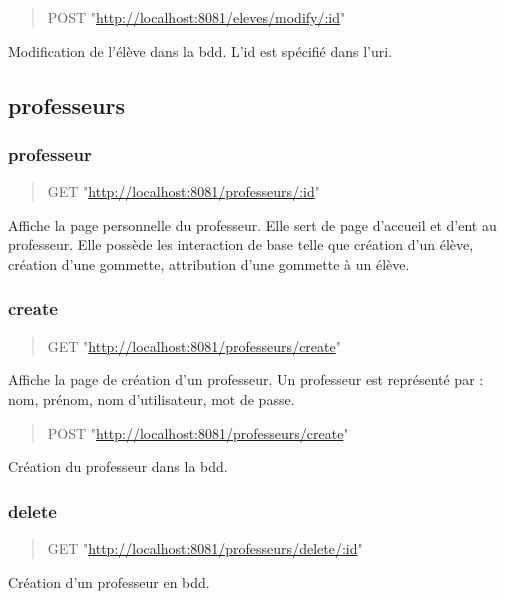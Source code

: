 \documentclass[11pt]{article}
\begin{document}
\begin{quote}
POST "\url{http://localhost:8081/eleves/modify/:id}"
\end{quote}

Modification de l'élève dans la bdd. L'id est spécifié dans l'uri.

\subsection{professeurs}
\label{sec:org3685dee}
\subsubsection{professeur}
\label{sec:org83091d6}

\begin{quote}
GET "\url{http://localhost:8081/professeurs/:id}"
\end{quote}

Affiche la page personnelle du professeur. Elle sert de page d'accueil et d'ent au professeur.
Elle possède les interaction de base telle que création d'un élève, création d'une gommette,
attribution d'une gommette à un élève.

\subsubsection{create}
\label{sec:org686ea93}

\begin{quote}
GET "\url{http://localhost:8081/professeurs/create}"
\end{quote}

Affiche la page de création d'un professeur. Un professeur est représenté par : nom, prénom, nom d'utilisateur, mot de passe.

\begin{quote}
POST "\url{http://localhost:8081/professeurs/create}"
\end{quote}

Création du professeur dans la bdd.

\subsubsection{delete}
\label{sec:org155f98a}

\begin{quote}
GET "\url{http://localhost:8081/professeurs/delete/:id}"
\end{quote}

Création d'un professeur en bdd.
\end{document}
